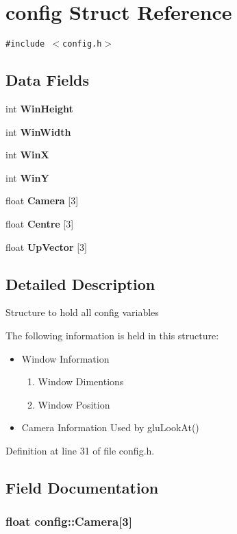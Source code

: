 \section{config Struct Reference}
\label{structconfig}
{\tt \#include $<$config.h$>$}

\subsection*{Data Fields}
\begin{CompactItemize}
\item 
int {\bf Win\-Height}
\item 
int {\bf Win\-Width}
\item 
int {\bf Win\-X}
\item 
int {\bf Win\-Y}
\item 
float {\bf Camera} [3]
\item 
float {\bf Centre} [3]
\item 
float {\bf Up\-Vector} [3]
\end{CompactItemize}


\subsection{Detailed Description}
Structure to hold all config variables

The following information is held in this structure:\begin{itemize}
\item Window Information\begin{enumerate}
\item Window Dimentions\item Window Position\end{enumerate}
\item Camera Information Used by glu\-Look\-At() \end{itemize}




Definition at line 31 of file config.h.

\subsection{Field Documentation}
\subsubsection{\setlength{\rightskip}{0pt plus 5cm}float {\bf config::Camera}[3]}\label{structconfig_o4}


